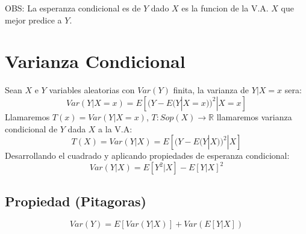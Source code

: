 \documentclass[titlepage,a4paper]{article}
\begin{document}
 OBS: La esperanza condicional es de $Y$ dado $X$ es la funcion de la V.A. $X$ que mejor predice a $Y$.
\section{Varianza Condicional}
Sean $X$ e $Y$ variables aleatorias con $Var(Y)$ finita, la varianza de $Y|X=x$ sera:
\begin{equation*}
    Var(Y|X=x)=E[(Y-E(Y|X=x))^{2}|X=x]
\end{equation*}
Llamaremos $T(x)=Var(Y|X=x)$, $T: Sop(X) \rightarrow \mathbb{R}$ llamaremos varianza condicional de $Y$ dada $X$ a la V.A:
\begin{equation*}
    T(X) = Var(Y|X) = E[(Y-E(Y|X))^{2}|X]
\end{equation*}
Desarrollando el cuadrado y aplicando propiedades de esperanza condicional:
\begin{equation*}
    Var(Y|X) = E[Y^{2}|X] - E[Y|X]^{2}
\end{equation*}
\subsection{Propiedad (Pitagoras)}
\begin{equation*}
    Var(Y) = E[Var(Y|X)] + Var(E[Y|X])
\end{equation*}
\end{document}
